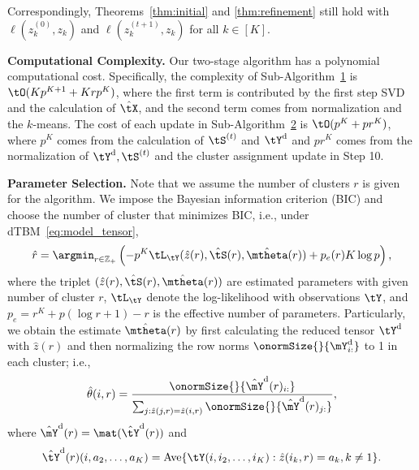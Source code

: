\documentclass[lettersize,onecolumn,journal]{IEEEtran}
\theoremstyle{definition}
\theoremstyle{definition}
\newcommand{\of}[1]{\left(#1\right)}
\begin{document}
{Correspondingly, Theorems~\ref{thm:initial} and \ref{thm:refinement} still hold with $\ell(z^{(0)}_k, z_k)$ and $\ell(z^{(t+1)}_k, z_k)$  for all $k \in [K]$.

{\bf Computational Complexity.} Our two-stage algorithm has a polynomial computational cost. Specifically, the complexity of Sub-Algorithm~\hyperref[alg:main]{1} is $\tO(K p^{K+1} + Krp^K)$, where the first term is contributed by the first step SVD and the calculation of $\hat \tX$, and the second term comes from normalization and the $k$-means.  The cost of each update in Sub-Algorithm~\hyperref[alg:main]{2} is $\tO(p^K + pr^K)$, where $p^K$ comes from the calculation of $\tS^{(t)}$ and $\tY^{\text{d}}$ and $pr^K$ comes from the normalization of $\tY^{\text{d}}, \tS^{(t)}$ and the cluster assignment update in Step 10.


{\bf Parameter Selection.} Note that we assume the number of clusters $r$ is given for the algorithm. We impose the Bayesian information criterion (BIC)
and choose the number of cluster that minimizes BIC, i.e., under dTBM~\eqref{eq:model_tensor},
\begin{equation}
    \hat r = \argmin_{r \in \mathbb{Z}_+ } \of{ -p^K \tL_{\tY}(\hat z(r), \hat \tS(r), \hat \mtheta(r)) + p_e(r) K \log p},
\end{equation}
where the triplet $(\hat z(r), \hat \tS(r), \hat \mtheta(r))$ are estimated parameters with given number of cluster $r$, $\tL_{\tY}$ denote the log-likelihood with observations $\tY$, and $p_e = r^K + p(\log r + 1) - r$ is the effective number of parameters. Particularly, we obtain the estimate $\hat \mtheta(r)$ by first calculating the reduced tensor $\tY^{\text{d}}$ with $\hat z(r)$ and then normalizing the row norms $\onormSize{}{\mY_{i:}^{\text{d}}}$ to 1 in each cluster; i.e., 
\begin{equation}
    \hat \theta(i,r) = \frac{\onormSize{}{\hat \mY^{\text{d}}(r)_{i:}}}{\sum_{j: \hat z(j,r) =  \hat z(i,r)} \onormSize{}{\hat \mY^{\text{d}}(r)_{j:}}},
\end{equation}
where $\hat \mY^{\text{d}}(r) = \mat(\hat \tY^{\text{d}}(r))$ and 
\begin{equation}
    \hat \tY^{\text{d}}(r)(i,a_2,\ldots,a_K) = 
\text{Ave}\{\tY(i,i_2,\ldots,i_K): \hat z(i_k, r) = a_k, k \neq 1 \}.
\end{equation}

}
\end{document}
